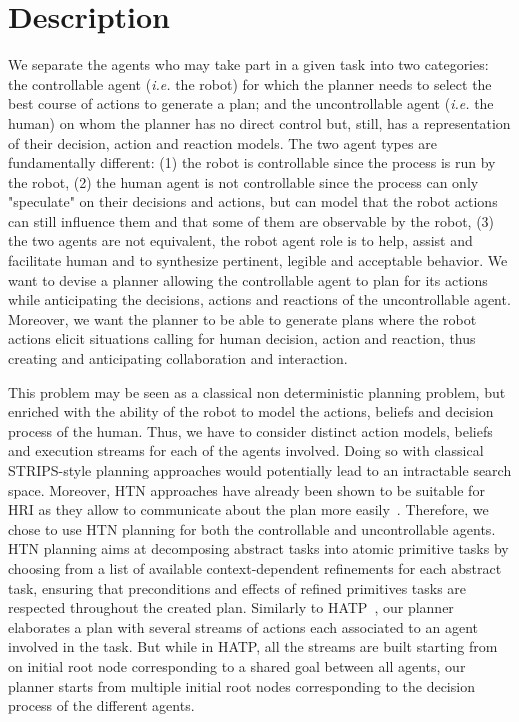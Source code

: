 \documentclass[a4paper,11pt,twoside]{StyleThese}
\begin{document}
\section{Description}
We separate the agents who may take part in a given task into two categories: the controllable agent (\textit{i.e.} the robot) for which the planner needs to select the best course of actions to generate a plan; and the uncontrollable agent (\textit{i.e.} the human) on whom the planner has no direct control but, still, has a representation of their decision, action and reaction models. The two agent types are fundamentally different: (1) the robot is controllable since the process is run by the robot, (2) the human agent is not controllable since the process can only "speculate" on their decisions and actions, but can model that the robot actions can still influence them and that some of them are observable by the robot, (3) the two agents are not equivalent, the robot agent role is to help, assist and facilitate human and to synthesize pertinent, legible and acceptable behavior.
We want to devise a planner allowing the controllable agent to plan for its actions while anticipating the decisions, actions and reactions of the uncontrollable agent. Moreover, we want the planner to be able to generate plans where the robot actions elicit situations calling for human decision, action and reaction, thus creating and anticipating collaboration and interaction.

\smallskip

This problem may be seen as a classical non deterministic planning problem, but enriched with the ability of the robot to model the actions, beliefs and decision process of the human. Thus, we have to consider distinct action models, beliefs and execution streams for each of the agents involved. Doing so with classical STRIPS-style planning approaches would potentially lead to an intractable search space. Moreover, HTN approaches have already been shown to be suitable for HRI as they allow to communicate about the plan more easily~\cite{lallement2014hatp}. Therefore, we chose to use HTN planning for both the controllable and uncontrollable agents. HTN planning aims at decomposing abstract tasks into atomic primitive tasks by choosing from a list of available context-dependent refinements for each abstract task, ensuring that preconditions and effects of refined primitives tasks are respected throughout the created plan. Similarly to HATP~\cite{sebastiani2017dealing}, our planner elaborates a plan with several streams of actions each associated to an agent involved in the task. But while in HATP, all the streams are built starting from on initial root node corresponding to a shared goal between all agents, our planner starts from multiple initial root nodes corresponding to the decision process of the different agents.
\end{document}
